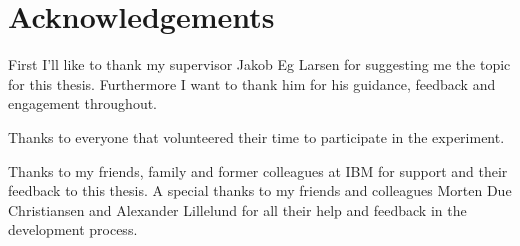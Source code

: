 \chapter{Acknowledgements}

First I'll like to thank my supervisor Jakob Eg Larsen for suggesting me the topic for this thesis. Furthermore I want to thank him for his guidance, feedback and engagement throughout.

Thanks to everyone that volunteered their time to participate in the experiment.

Thanks to my friends, family and former colleagues at IBM for support and their feedback to this thesis. A special thanks to my friends and colleagues Morten Due Christiansen and Alexander Lillelund for all their help and feedback in the development process.